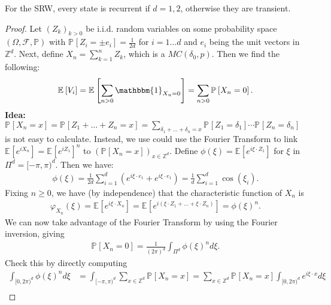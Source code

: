 \begin{theorem}[]
	For the SRW, every state is recurrent if $d=1,2$, otherwise they are transient.
\end{theorem}
\begin{proof}
	Let $(Z_k)_{k> 0}$ be i.i.d. random variables on some probability space $(\Omega, \mathcal{F}, \mathbb{P})$ with $\mathbb{P}_{} \left[ Z_i = \pm e_i \right] = \frac{1}{2d}$ for $i= 1 \ldots d$ and $e_i$ being the unit vectors in $\mathbb{Z}^{d}$. Next, define $X_n = \sum_{k=1}^{n} Z_k$, which is a $MC(\delta_0, p)$. Then we find the following:
	\begin{align}
		\mathbb{E}_{} \left[ V_i \right] = \mathbb{E}_{} \left[ \sum_{n> 0}^{} \mathbbm{1}_{X_n =0}  \right] = \sum_{n> 0}^{} \mathbb{P}_{} \left[ X_n = 0 \right] .
	\end{align}
	\textbf{Idea:} $\mathbb{P}_{} \left[ X_n=x \right]  = \mathbb{P}_{} \left[ Z_1+ \ldots + Z_n = x \right] = \sum_{\delta_1 + \ldots + \delta_n =x}^{} \mathbb{P}_{} \left[ Z_1 = \delta_1 \right] \cdots \mathbb{P}_{} \left[ Z_n = \delta_n \right]  $ is not easy to calculate. Instead, we use could use the Fourier Transform to link $\mathbb{E}_{} \left[ e^{i X_n} \right] = \mathbb{E}_{} \left[ e^{iZ_1} \right] ^n $ to $(\mathbb{P}_{} \left[ X_n =x\right] )_{x \in \mathbb{Z}^d}$.
	Define $\phi(\xi) = \mathbb{E}_{} \left[ e^{i \xi \cdot Z_1} \right] $ for $\xi$ in $\Pi^d = [-\pi, \pi)^d$. Then we have:
	\begin{align}
		\phi(\xi) = \frac{1}{2d} \sum_{i=1}^{d} (e^{i \xi \cdot e_1} + e^{i \xi \cdot e_1}) = \frac{1}{d} \sum_{i=1}^{d} \cos(\xi_i)
	.\end{align}
	Fixing $n\geq 0$, we have (by independence) that the characteristic function of $X_n$ is 
	\begin{align}
		\varphi_{X_n}(\xi) = \mathbb{E}_{} \left[ e^{i \xi \cdot X_n} \right]  = \mathbb{E}_{} \left[ e ^{i ( \xi \cdot Z_1 + \ldots + \xi \cdot Z_n)} \right] = \phi(\xi)^n. 	
	\end{align}
We can now take advantage of the Fourier Transform by using the Fourier inversion, giving
\begin{align}
	\mathbb{P}_{} \left[ X_n = 0 \right] = \frac{1}{(2 \pi) ^d} \int_{\Pi^d}^{} \phi(\xi)^n d\xi.
\end{align}
Check this by directly computing
\begin{align}
	\int_{[0, 2\pi)^d}^{} \phi(\xi)^n d\xi &= \int_{[-\pi, \pi)^d}^{} \sum_{x \in \mathbb{Z}^d}^{} \mathbb{P}_{} \left[ X_n = x \right] = \sum_{x \in \mathbb{Z}^d}^{} \mathbb{P}_{} \left[ X_n = x \right] \int_{[0, 2 \pi)^d}^{} e^{i \xi \cdot x} d\xi  \\

\end{align}
\end{proof}
